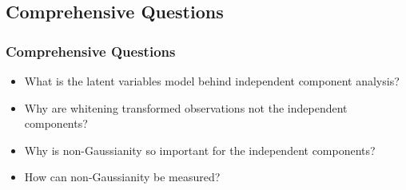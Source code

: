 \subsection{Comprehensive Questions}

\begin{frame}
  \frametitle{Comprehensive Questions}

  \begin{itemize}
    \item What is the latent variables model behind independent component analysis? \\[.5cm]
    \item Why are whitening transformed observations not the independent components? \\[.5cm]
    \item Why is non-Gaussianity so important for the independent components? \\[.5cm]
    \item How can non-Gaussianity be measured?
  \end{itemize}
\end{frame}
